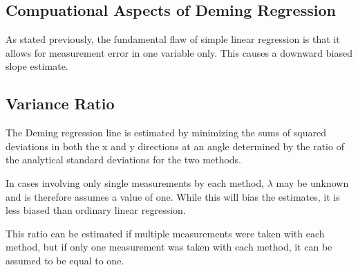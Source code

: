 \documentclass[12pt, a4paper]{report}
\theoremstyle{plain}
\theoremstyle{definition}
\theoremstyle{remark}
\begin{document}







\subsection{Compuational Aspects of Deming Regression}









As stated previously, the fundamental flaw of simple linear regression is that it allows for measurement error in one variable only. This causes a downward biased slope estimate.





\subsection{Variance Ratio}

	


The Deming regression line is estimated by minimizing the sums of squared deviations in both the x and y directions at an angle determined by the ratio of the analytical standard deviations for the two methods.

In cases involving only single measurements by each method, $\lambda$ may be unknown and is therefore assumes a value of one. While this will bias the estimates, it is less biased than ordinary linear regression.

This ratio can be estimated if multiple measurements were taken with each method, but if only one measurement was taken with each method, it can be assumed to be equal to one.




\end{document}
